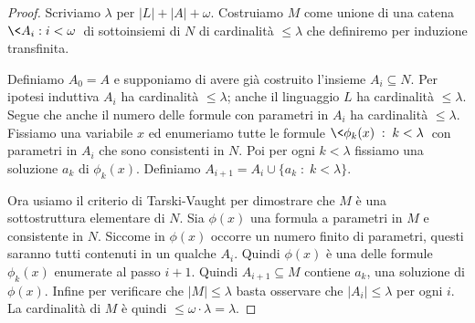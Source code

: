 \begin{proof}
Scriviamo $\lambda$ per $|L|+|A|+\omega$. Costruiamo $M$ come unione di una catena $\<A_i:i<\omega\>$ di sottoinsiemi di $N$ di cardinalit\`a $\le\lambda$ che definiremo per induzione transfinita.

Definiamo $A_0=A$ e supponiamo di avere gi\`a costruito l'insieme $A_i\subseteq N$. Per ipotesi induttiva $A_i$ ha cardinalit\`a $\le\lambda$; anche il linguaggio $L$ ha cardinalit\`a $\le\lambda$. Segue che anche il numero delle formule con parametri in $A_i$ ha cardinalit\`a $\le\lambda$. Fissiamo una variabile $x$ ed enumeriamo tutte le formule $\<\phi_k(x)\;:\;k<\lambda\>$ con parametri in $A_i$ che sono consistenti in $N$. Poi per ogni $k<\lambda$ fissiamo una soluzione $a_k$ di $\phi_k(x)$.  Definiamo $A_{i+1}=A_i\cup\{a_k\;:\;k<\lambda\}$.

Ora usiamo il criterio di Tarski-Vaught per dimostrare che $M$ \`e una sottostruttura elementare di $N$. Sia  $\phi(x)$ una formula a parametri in $M$ e consistente in $N$. Siccome in $\phi(x)$ occorre un numero finito di parametri, questi saranno tutti contenuti in un qualche $A_i$. Quindi $\phi(x)$ \`e una delle formule $\phi_k(x)$ enumerate al passo $i+1$. Quindi $A_{i+1}\subseteq M$ contiene $a_k$, una soluzione di $\phi(x)$. Infine per verificare che $|M|\le\lambda$ basta osservare che $|A_i|\le\lambda$ per ogni $i$. La cardinalit\`a di $M$ \`e quindi $\le\omega\cdot\lambda=\lambda$.
\end{proof}


